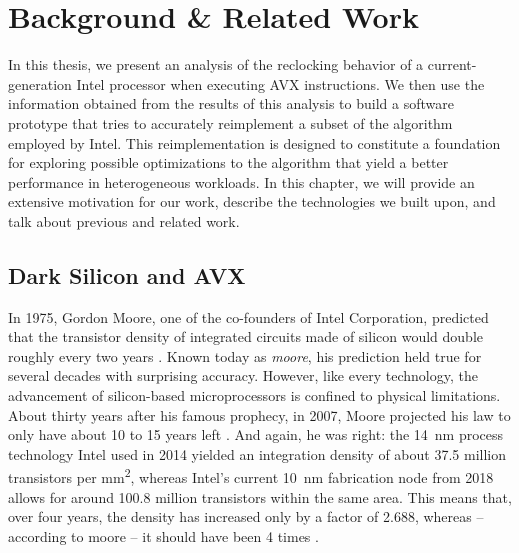 \chapter{Background \& Related Work}
\label{sec:background}

In this thesis, we present an analysis of the reclocking behavior of a current-generation Intel processor when executing \gls{AVX} instructions. We then use the information obtained from the results of this analysis to build a software prototype that tries to accurately reimplement a subset of the algorithm employed by Intel. This reimplementation is designed to constitute a foundation for exploring possible optimizations to the algorithm that yield a better performance in heterogeneous workloads. In this chapter, we will provide an extensive motivation for our work, describe the technologies we built upon, and talk about previous and related work.

\section{Dark Silicon and AVX}
\label{sec:background:motivation}

In 1975, Gordon Moore, one of the co-founders of Intel Corporation, predicted that the transistor density of integrated circuits made of silicon would double roughly every two years \cite{moore1975progress}. Known today as \emph{\gls{moore}}, his prediction held true for several decades with surprising accuracy. However, like every technology, the advancement of silicon-based microprocessors is confined to physical limitations. About thirty years after his famous prophecy, in 2007, Moore projected his law to only have about 10 to 15 years left \cite{moore2007interview}. And again, he was right: the \SI{14}{\nano\meter} process technology Intel used in 2014 yielded an integration density of about 37.5 million transistors per \si{\milli\meter\squared}, whereas Intel's current \SI{10}{\nano\meter} fabrication node from 2018 allows for around 100.8 million transistors within the same area. This means that, over four years, the density has increased only by a factor of 2.688, whereas -- according to \gls{moore} -- it should have been 4 times \cite{courtland2017intel}.


